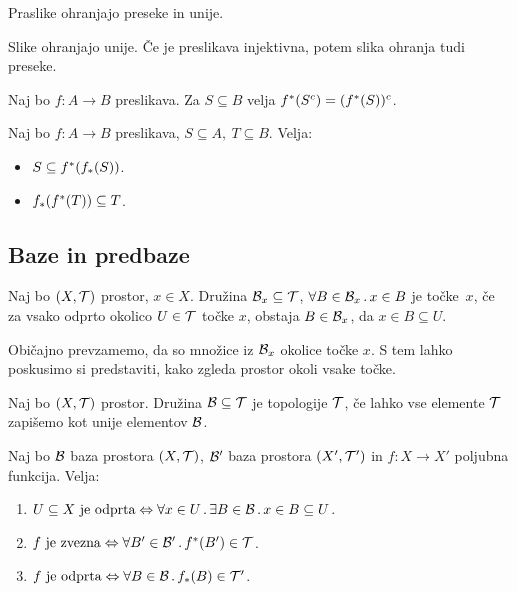 \begin{trditev}
    Praslike ohranjajo preseke in unije.
\end{trditev}

\begin{trditev}
    Slike ohranjajo unije. Če je preslikava injektivna, potem slika ohranja tudi preseke.
\end{trditev}

\begin{trditev}
    Naj bo $f: A \to B$ preslikava. Za $S \subseteq B$ velja $f^{*}(S^c) = (f^{*}(S))^c$.
\end{trditev}

\begin{trditev}
    Naj bo $f: A \to B$ preslikava, $S \subseteq A, \ T \subseteq B$. Velja:
    \begin{itemize}
        \item $S \subseteq f^{*}(f_{*}(S))$.
        \item $f_{*}(f^{*}(T)) \subseteq T$.
    \end{itemize}
\end{trditev}

\subsection{Baze in predbaze}

\begin{definicija}
    Naj bo $(X, \mathcal{T})$ prostor, $x \in X$. Družina $\mathcal{B}_x \subseteq \mathcal{T}$, $\forall B \in \mathcal{B}_x \,.\, x \in B$ je  točke~$x$, če za vsako odprto okolico $U \in \mathcal{T}$ točke $x$, obstaja $B \in \mathcal{B}_x$, da $x \in B \subseteq U$.
\end{definicija}

\begin{opomba}
    Običajno prevzamemo, da so množice iz $\mathcal{B}_x$ okolice točke $x$. S tem lahko poskusimo si predstaviti, kako zgleda prostor okoli vsake točke.
\end{opomba}

\begin{definicija}
    Naj bo $(X, \mathcal{T})$ prostor. Družina $\mathcal{B} \subseteq \mathcal{T}$ je  topologije $\mathcal{T}$, če lahko vse elemente $\mathcal{T}$ zapišemo kot unije elementov $\mathcal{B}$.
\end{definicija}

\begin{trditev}
    Naj bo $\mathcal{B}$ baza prostora $(X, \mathcal{T})$, $\mathcal{B}'$ baza prostora $(X', \mathcal{T}')$ in $f: X \to X'$ poljubna funkcija. Velja:
    \begin{enumerate}
        \item $U \subseteq X \text{ je odprta} \Leftrightarrow \forall x \in U \,.\, \exists B \in \mathcal{B} \,.\, x \in B \subseteq U$.
        \item $f \text{ je zvezna} \Leftrightarrow \forall B' \in \mathcal{B}' \,.\, f^{*}(B') \in \mathcal{T}$.
        \item $f \text{ je odprta} \Leftrightarrow \forall B \in \mathcal{B} \,.\, f_{*}(B) \in \mathcal{T}'$.
    \end{enumerate}
\end{trditev}

